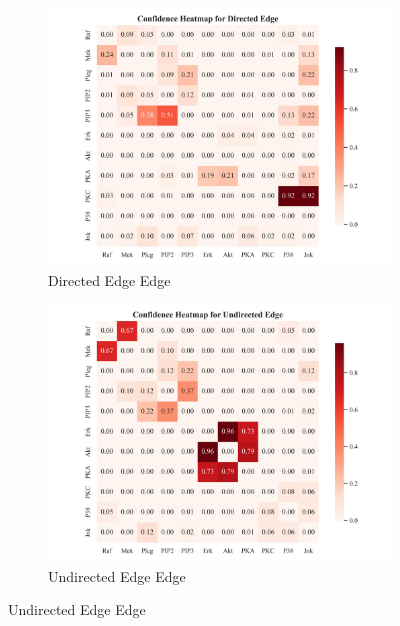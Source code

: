 \documentclass{article}
\begin{document}
\begin{figure}[H]
    \centering

\begin{subfigure}{0.32\textwidth}
        \centering
        \includegraphics[width=\linewidth]{./demo_data/20241104_135804/sachs/output_graph/certain_edges_confidence_heatmap.jpg}
        \caption{Directed Edge Edge}
\end{subfigure}
\begin{subfigure}{0.32\textwidth}
        \centering
        \includegraphics[width=\linewidth]{./demo_data/20241104_135804/sachs/output_graph/uncertain_edges_confidence_heatmap.jpg}
        \caption{Undirected Edge Edge}
\end{subfigure}

\end{figure}
\end{document}
